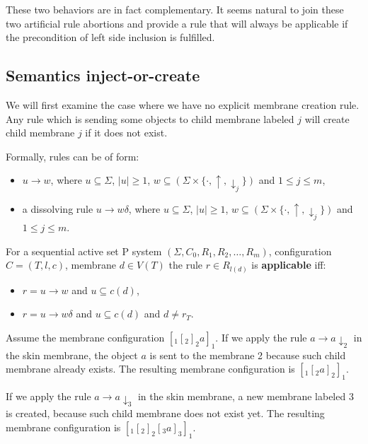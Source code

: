 \documentclass[submission,copyright,creativecommons]{../lib/lncs/llncs}
\begin{document}
These two behaviors are in fact complementary. It seems natural to join these two artificial rule abortions and provide a rule that will always be applicable if the precondition of left side inclusion is fulfilled.

\subsection{Semantics inject-or-create} %
\label{sub:semantics_inject_or_create}

We will first examine the case where we have no explicit membrane creation rule. Any rule which is sending some objects to child membrane labeled $j$ will create child membrane $j$ if it does not exist.

Formally, rules can be of form:
\begin{itemize}
  \item $u\rightarrow w$, where $u\subseteq \Sigma$, $|u|\geq 1$, $w\subseteq (\Sigma\times\{\cdot, \uparrow, \downarrow_j\})$ and $1\leq j\leq m$,
  \item a dissolving rule $u\rightarrow w\delta$, where $u\subseteq \Sigma$, $|u|\geq 1$, $w\subseteq (\Sigma\times\{\cdot, \uparrow, \downarrow_j\})$ and $1\leq j\leq m$.
\end{itemize}

For a sequential active set P system $(\Sigma, C_0, R_1, R_2, \dots , R_m)$, configuration $C = (T, l, c)$, membrane $d\in V(T)$ the rule $r\in R_{l(d)}$ is {\bf applicable} iff:
\begin{itemize}
  \item $r = u\rightarrow w$ and $u\subseteq c(d)$,
  \item $r = u\rightarrow w\delta$ and $u\subseteq c(d)$ and $d\neq r_T$.
\end{itemize}

\begin{example}
  Assume the membrane configuration $[_1 [_2 ]_2 a ]_1$. If we apply the rule $a \rightarrow a\downarrow_2$ in the skin membrane, the object $a$ is sent to the membrane 2 because such child membrane already exists. The resulting membrane configuration is $[_1 [_2 a ]_2 ]_1$.

  If we apply the rule $a \rightarrow a\downarrow_3$ in the skin membrane, a new membrane labeled 3 is created, because such child membrane does not exist yet. The resulting membrane configuration is $[_1 [_2 ]_2 [_3 a ]_3 ]_1$.
\end{example}
\end{document}
